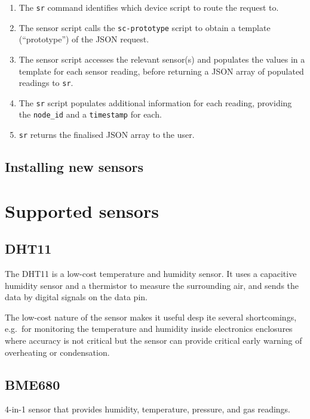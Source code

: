 \documentclass[
]{book}
\begin{document}
\begin{enumerate}
\def\labelenumi{\arabic{enumi}.}
\item
  The \texttt{sr} command identifies which device script to route the request to.
\item
  The sensor script calls the \texttt{sc-prototype} script to obtain a template (``prototype'') of the JSON request.
\item
  The sensor script accesses the relevant sensor(s) and populates the values in a template for each sensor reading, before returning a JSON array of populated readings to \texttt{sr}.
\item
  The \texttt{sr} script populates additional information for each reading, providing the \texttt{node\_id} and a \texttt{timestamp} for each.
\item
  \texttt{sr} returns the finalised JSON array to the user.
\end{enumerate}

\section{Installing new sensors}\label{installing-new-sensors}

\chapter{Supported sensors}\label{supported-sensors}

\section{DHT11}\label{dht11}

The DHT11 is a low-cost temperature and humidity sensor. It uses a capacitive humidity sensor and a thermistor to measure the surrounding air, and sends the data by digital signals on the data pin.

The low-cost nature of the sensor makes it useful desp ite several shortcomings, e.g.~for monitoring the temperature and humidity inside electronics enclosures where accuracy is not critical but the sensor can provide critical early warning of overheating or condensation.

\section{BME680}\label{bme680}

4-in-1 sensor that provides humidity, temperature, pressure, and gas readings.
\end{document}
